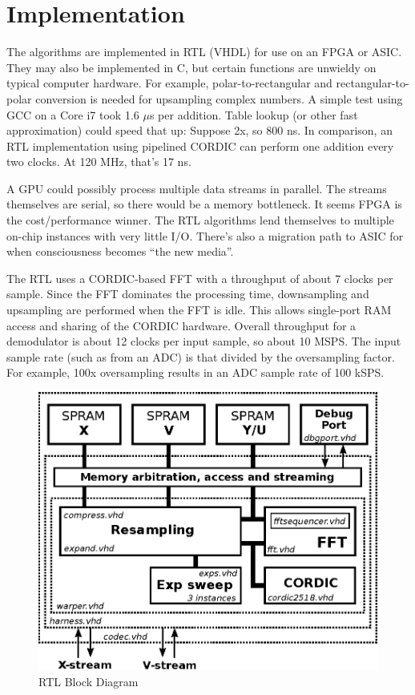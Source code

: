 \section{Implementation}

The algorithms are implemented in RTL (VHDL) for use on an FPGA or ASIC.
They may also be implemented in C, but certain functions are unwieldy on
typical computer hardware. For example, polar-to-rectangular and
rectangular-to-polar conversion is needed for upsampling complex numbers.
A simple test using GCC on a Core i7 took 1.6 $\mu$s per addition.
Table lookup (or other fast approximation) could speed that up:
Suppose 2x, so 800 ns.
In comparison, an RTL implementation using pipelined CORDIC can perform
one addition every two clocks. At 120 MHz, that's 17 ns.

A GPU could possibly process multiple data streams in parallel.
The streams themselves are serial, so there would be a memory bottleneck.
It seems FPGA is the cost/performance winner.
The RTL algorithms lend themselves to multiple on-chip instances with very
little I/O. There's also a migration path to ASIC for when consciousness
becomes ``the new media''.

The RTL uses a CORDIC-based FFT with a throughput of about 7 clocks per sample.
Since the FFT dominates the processing time, downsampling and upsampling
are performed when the FFT is idle. This allows single-port RAM access and
sharing of the CORDIC hardware.
Overall throughput for a demodulator is about 12 clocks per input sample,
so about 10 MSPS. The input sample rate (such as from an ADC) is that divided
by the oversampling factor. For example, 100x oversampling results in
an ADC sample rate of 100 kSPS.

\begin{figure}
	\centering
	\includegraphics[width=0.8\linewidth]{../source/rtl_e}
	\caption[Emergent to Causal Time Hardware]{RTL Block Diagram}
	\label{fig:rtl}
\end{figure}

